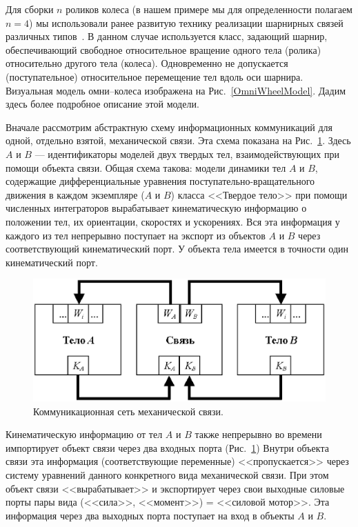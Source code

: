 \documentclass[12pt,a4paper]{article}
\begin{document}
Для сборки $n$ роликов колеса (в нашем примере мы для определенности полагаем
$n=4$) мы использовали ранее развитую технику реализации шарнирных связей
различных типов~\cite{Kosenko2007}. В данном случае используется класс, 
задающий шарнир, обеспечивающий свободное относительное вращение одного тела
(ролика) относительно другого тела (колеса). Одновременно не допускается 
(поступательное) относительное перемещение тел вдоль оси шарнира. Визуальная 
модель омни--колеса изображена на Рис.~\ref{OmniWheelModel}. Дадим здесь более
подробное описание этой модели.

Вначале рассмотрим абстрактную схему информационных коммуникаций для одной,
отдельно взятой, механической связи. Эта схема показана на 
Рис.~\ref{ConstraintScheme}. Здесь $A$ и $B$ --- идентификаторы моделей двух 
твердых тел, взаимодействующих при помощи объекта связи. Общая схема такова: 
модели динамики тел $A$ и $B$, содержащие дифференциальные уравнения 
поступательно-вращательного движения в каждом экземпляре ($A$ и $B$) класса
<<Твердое тело>> при помощи численных интеграторов вырабатывает кинематическую
информацию о положении тел, их ориентации, скоростях и ускорениях. Вся эта 
информация у каждого из тел непрерывно поступает на экспорт из объектов $A$ и 
$B$ через соответствующий кинематический порт. У объекта тела имеется в 
точности один кинематический порт.

\begin{figure}[htb]
\centering\includegraphics[width=14cm]{Fig_2_1.eps}
\caption{Коммуникационная сеть механической связи.}
\label{ConstraintScheme}
\end{figure}

Кинематическую информацию от тел $A$ и $B$ также непрерывно во времени 
импортирует объект связи через два входных порта (Рис.~\ref{ConstraintScheme})
Внутри объекта связи эта информация (соответствующие переменные) 
<<пропускается>> через систему уравнений данного конкретного вида механической
связи. При этом объект связи <<вырабатывает>> и экспортирует через свои 
выходные силовые порты пары вида (<<сила>>, <<момент>>) = <<силовой мотор>>. 
Эта информация через два выходных порта поступает на вход в объекты $A$ и $B$.
\end{document}
